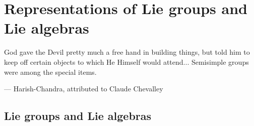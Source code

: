 \section{Representations of Lie groups and Lie algebras}\label{ch2:lie-group}

\setlength\epigraphwidth{9cm}
\epigraph{God gave the Devil pretty much a free hand in building things, but told him to keep off certain objects to which He Himself would attend... Semisimple groups were among the special items.}{--- \textup{Harish-Chandra, attributed to Claude Chevalley}}

\subsection{Lie groups and Lie algebras}\label{ch2:lie-group-definition}

